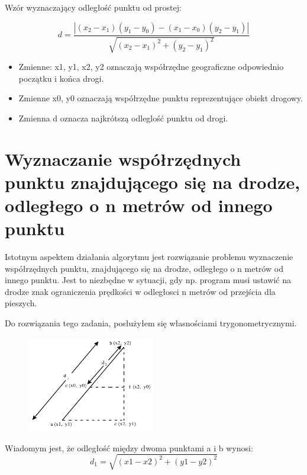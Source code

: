 Wzór wyznaczający odległość punktu od prostej:

\begin{equation} \label{eq:distancePointLineal}
d = \frac{| (x_2 - x_1)(y_1 - y_0) - (x_1 - x_0)(y_2 - y_1) |}{\sqrt{(x_2 - x_1)^2 + (y_2 - y_1)^2}}
\end{equation}\newline

\begin{itemize}
\item Zmienne: x1, y1, x2, y2 oznaczają współrzędne geograficzne odpowiednio początku i końca drogi. 
\item Zmienne x0, y0 oznaczają współrzędne punktu reprezentujące obiekt drogowy.
\item Zmienna d oznacza najkrótszą odleglość punktu od drogi.  
\end{itemize}


\newpage
\section{Wyznaczanie współrzędnych punktu znajdującego się na drodze, odległego o n metrów od innego punktu}
\label{sec:pointCoordinatesFromAnotherPoint}

Istotnym aspektem działania algorytmu jest rozwiązanie problemu wyznaczenie współrzędnych punktu, znajdującego się na drodze, odległego o n metrów od innego punktu.  Jest to niezbędne w sytuacji, gdy np. program musi ustawić na drodze znak ograniczenia prędkości w odległosci n metrów od przejścia dla pieszych.

Do rozwiązania tego zadania, posłużyłem się własnościami trygonometrycznymi.


\begin{figure}[h]
\label{odlegloscPktProsta}
\centering
\includegraphics[width=0.5\textwidth]{distance}
\end{figure}

Wiadomym jest, że odległość między dwoma punktami a i b wynosi:
\begin{equation} \label{eq:coordinatesFromPoint}
d_1 = \sqrt{(x1 - x2)^2 + (y1 - y2)^2}
\end{equation}\newline

